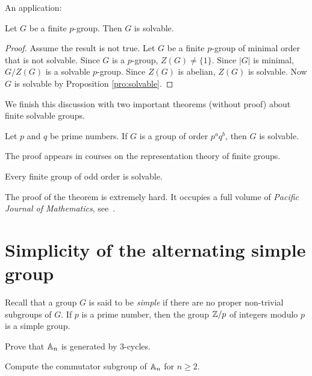 An application:

\begin{proposition}
    Let $G$ be a finite $p$-group. Then $G$ is solvable. 
\end{proposition}

\begin{proof}
    Assume the result is not true. Let $G$ be a finite
    $p$-group of minimal order that is not solvable. Since 
    $G$ is a $p$-group, $Z(G)\ne\{1\}$. Since $|G|$ is minimal, 
    $G/Z(G)$ is a solvable $p$-group. Since $Z(G)$ is abelian, 
    $Z(G)$ is solvable. Now $G$ is solvable 
    by Proposition \ref{pro:solvable}.
\end{proof}

We finish this discussion with two important theorems (without proof) 
about finite solvable groups. 

\begin{theorem}[Burnside]
    Let $p$ and $q$ be prime numbers. If $G$ is a group
    of order $p^aq^b$, then $G$ is solvable. 
\end{theorem}

The proof appears in courses on the 
representation theory of finite groups. 

\begin{theorem}
    Every finite group of odd order is solvable.
\end{theorem}

The proof of the theorem is extremely hard. It occupies a full volume of
\emph{Pacific Journal of Mathematics}, see~\cite{MR166261}.

\section{Simplicity of the alternating simple group}

Recall that a group $G$ is said to be \emph{simple} 
if there are no proper non-trivial subgroups of $G$. If $p$
is a prime number, then the group 
$\mathbb{Z}/p$ of integers modulo $p$ 
is a simple group. 

\begin{exercise}
    Prove that $\mathbb{A}_n$ is generated by 3-cycles. 
\end{exercise}

\begin{exercise}
    Compute the commutator subgroup of $\mathbb{A}_n$ for
    $n\geq2$. 
\end{exercise}

